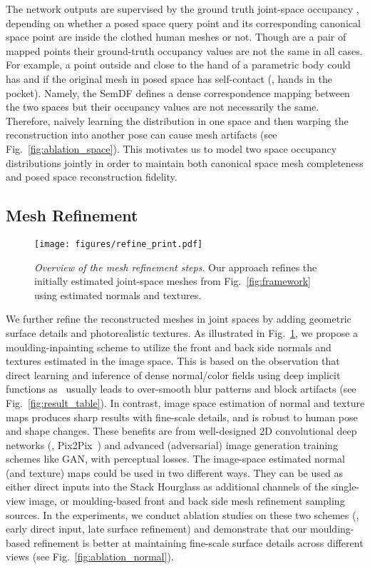 \documentclass[10pt,twocolumn,letterpaper]{article}
\newcommand{\beforefigcaption}{\vspace{-5mm}}
\newcommand{\afterfigcaption}{\vspace{-5mm}}
\newcommand{\beforesubsection}{\vspace{-1.5mm}}
\newcommand{\aftersubsection}{\vspace{-1.5mm}}
\begin{document}
The network outputs  are supervised by the ground truth joint-space occupancy , depending on whether a posed space query point  and its corresponding canonical space point  are inside the clothed human meshes or not. Though  are a pair of mapped points their ground-truth occupancy values are not the same in all cases.
For example, a point outside and close to the hand of a parametric body could has  and  if the original mesh in posed space has self-contact (\eg, hands in the pocket).
Namely, the SemDF defines a dense correspondence mapping between the two spaces but their occupancy values are not necessarily the same. Therefore, naively learning the distribution in one space and then warping the reconstruction into another pose can cause mesh artifacts (see Fig.~\ref{fig:ablation_space}). This motivates us to model two space occupancy distributions jointly in order to maintain both canonical space mesh completeness and posed space reconstruction fidelity.

\beforesubsection
\subsection{Mesh Refinement} \label{sec:mesh_refine}
\aftersubsection

\begin{figure}[ptb]
\vspace{-2mm}
\centering
\texttt{[image: figures/refine\_print.pdf]}
\beforefigcaption
\caption{\emph{Overview of the mesh refinement steps}. Our approach refines the initially estimated joint-space meshes from Fig.~\ref{fig:framework} using estimated normals and textures.}
\afterfigcaption
\label{fig:refine}
\end{figure}

We further refine the reconstructed meshes in joint spaces by adding geometric surface details and photorealistic textures. As illustrated in Fig.~\ref{fig:refine}, we propose a moulding-inpainting scheme to utilize the front and back side normals and textures estimated in the image space. This is based on the observation that direct learning and inference of dense normal/color fields using deep implicit functions as~\cite{huang2020arch} usually leads to over-smooth blur patterns and block artifacts (see Fig.~\ref{fig:result_table}).
In contrast, image space estimation of normal and texture maps produces sharp results with fine-scale details, and is robust to human pose and shape changes. These benefits are from well-designed 2D convolutional deep networks (\eg, Pix2Pix~\cite{isola2017image,wang2018high}) and advanced (adversarial) image generation training schemes like GAN, with perceptual losses. The image-space estimated normal (and texture) maps could be used in two different ways. They can be used as either direct inputs into the Stack Hourglass as additional channels of the single-view image, or moulding-based front and back side mesh refinement sampling sources. In the experiments, we conduct ablation studies on these two schemes (\ie, early direct input, late surface refinement) and demonstrate that our moulding-based refinement is better at maintaining fine-scale surface details across different views (see Fig.~\ref{fig:ablation_normal}).
\end{document}
